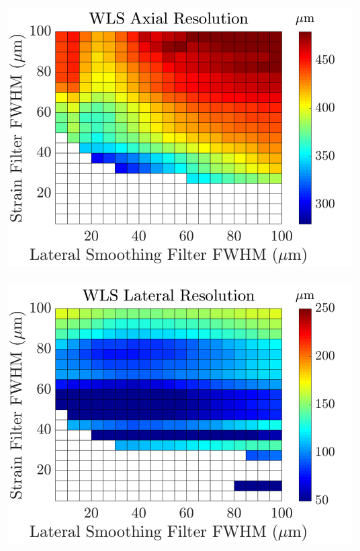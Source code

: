 \begin{figure}[b!]
	\centering
	\begin{subfigure}{0.49\textwidth}
		\centering
		\includegraphics[width=\textwidth]{imageres_figs/wls_axial.png}
	\end{subfigure}
	\begin{subfigure}{0.49\textwidth}
		\centering
		\includegraphics[width=\textwidth]{imageres_figs/wls_lateral.png}
	\end{subfigure}
	\\
	\begin{subfigure}{0.49\textwidth}
		\centering

\end{subfigure}
\end{figure}
